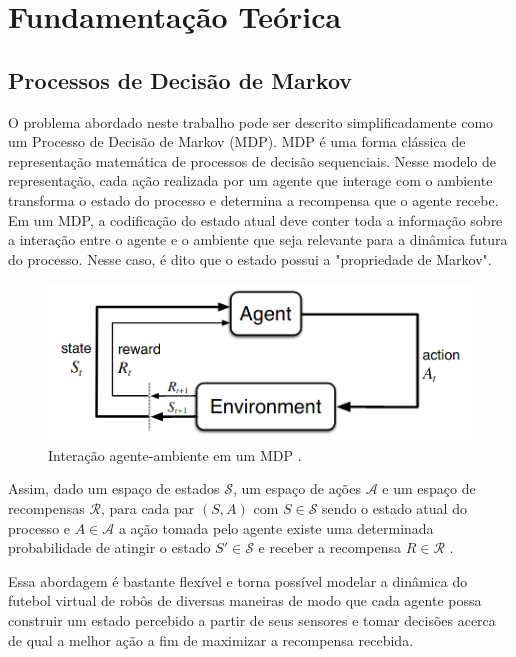 \chapter{Fundamentação Teórica}
\label{chap:Fundamentacao}



\section{Processos de Decisão de Markov}

O problema abordado neste trabalho pode ser descrito simplificadamente como um Processo de Decisão de Markov (MDP).
MDP é uma forma clássica de representação matemática de processos de decisão sequenciais.
Nesse modelo de representação, cada ação realizada por um agente que interage com o ambiente transforma o estado do processo e determina a recompensa que o agente recebe.
Em um MDP, a codificação do estado atual deve conter toda a informação sobre a interação entre o agente e o ambiente que seja relevante para a dinâmica futura do processo. Nesse caso, é dito que o estado possui a "propriedade de Markov".

\begin{figure}[h]
	\includegraphics[width=0.6\linewidth]{figs/RL.png}
	\centering
	\caption{Interação agente-ambiente em um MDP \cite{sutton2018reinforcement}.} %
	\label{fig:mdp_env}
\end{figure}

Assim, dado um espaço de estados $\mathcal{S}$, um espaço de ações $\mathcal{A}$ e um espaço de recompensas $\mathcal{R}$, para cada par $(S, A)$ com $S \in \mathcal{S}$ sendo o estado atual do processo e $A \in \mathcal{A}$ a ação tomada pelo agente existe uma determinada probabilidade de atingir o estado $S' \in \mathcal{S}$ e receber a recompensa $R \in \mathcal{R}$ \cite{sutton2018reinforcement}.

Essa abordagem é bastante flexível e torna possível modelar a dinâmica do futebol virtual de robôs de diversas maneiras de modo que cada agente possa construir um estado percebido a partir de seus sensores e tomar decisões acerca de qual a melhor ação a fim de maximizar a recompensa recebida.

